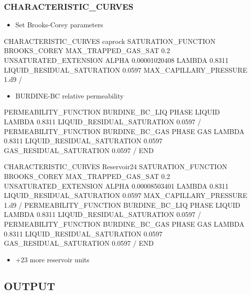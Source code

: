 \documentclass{beamer}
\newcommand\greencomment[1]{{{\color{green} #1}}}
\begin{document}
\begin{frame}\frametitle{CHARACTERISTIC\_CURVES}

\begin{itemize}
\item Set Brooks-Corey parameters
\end{itemize}

\begin{semiverbatim}
CHARACTERISTIC_CURVES caprock
  SATURATION_FUNCTION BROOKS_COREY
    \greencomment{MAX_TRAPPED_GAS_SAT 0.2}
    \greencomment{UNSATURATED_EXTENSION}
    ALPHA 0.00001020408
    LAMBDA 0.8311
    LIQUID_RESIDUAL_SATURATION 0.0597
    MAX_CAPILLARY_PRESSURE 1.d9
  / 
\newpage
\begin{itemize}
\item BURDINE-BC relative permeability
\end{itemize}
  PERMEABILITY_FUNCTION BURDINE_BC_LIQ
    PHASE LIQUID
    LAMBDA 0.8311
    LIQUID_RESIDUAL_SATURATION 0.0597
  /
  PERMEABILITY_FUNCTION BURDINE_BC_GAS
    PHASE GAS
    LAMBDA 0.8311
    LIQUID_RESIDUAL_SATURATION 0.0597
    GAS_RESIDUAL_SATURATION 0.0597
  /
END
\end{semiverbatim}

\newpage

\begin{semiverbatim}
CHARACTERISTIC_CURVES Reservoir24
  SATURATION_FUNCTION BROOKS_COREY
    \greencomment{MAX_TRAPPED_GAS_SAT 0.2}
    \greencomment{UNSATURATED_EXTENSION}
    ALPHA 0.00008503401
    LAMBDA 0.8311
    LIQUID_RESIDUAL_SATURATION 0.0597
    MAX_CAPILLARY_PRESSURE 1.d9
  /
\newpage
  PERMEABILITY_FUNCTION BURDINE_BC_LIQ
    PHASE LIQUID
    LAMBDA 0.8311
    LIQUID_RESIDUAL_SATURATION 0.0597
  /
  PERMEABILITY_FUNCTION BURDINE_BC_GAS
    PHASE GAS
    LAMBDA 0.8311
    LIQUID_RESIDUAL_SATURATION 0.0597
    GAS_RESIDUAL_SATURATION 0.0597
  /
END
\end{semiverbatim}

\newpage
\begin{itemize}
  \item +23 more reservoir units
\end{itemize}

\end{frame}

\subsection{OUTPUT}
\end{document}
